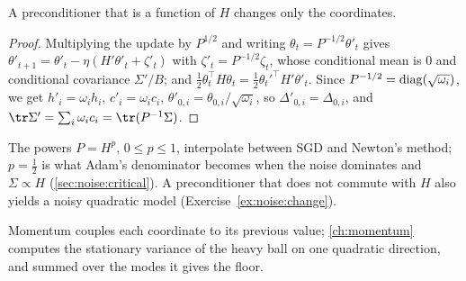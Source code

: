 \begin{refsection}
A preconditioner that is a function of $H$ changes only the coordinates.


\begin{proof}
Multiplying the update by $P^{1/2}$ and writing $\theta_t=P^{-1/2}\theta'_t$ gives $\theta'_{t+1}=\theta'_t-\eta(H'\theta'_t+\zeta'_t)$ with $\zeta'_t=P^{-1/2}\zeta_t$, whose conditional mean is $0$ and conditional covariance $\Sigma'/B$; and $\frac12\theta_t^\top H\theta_t=\frac12\theta_t'^\top H'\theta'_t$. Since $P^{-1/2}=\operatorname{diag}(\sqrt{\omega_i})$, we get $h'_i=\omega_ih_i$, $c'_i=\omega_ic_i$, $\theta'_{0,i}=\theta_{0,i}/\sqrt{\omega_i}$, so $\Delta'_{0,i}=\Delta_{0,i}$, and $\tr\Sigma'=\sum_i\omega_ic_i=\tr(P^{-1}\Sigma)$.
\end{proof}

The powers $P=H^p$, $0\le p\le1$, interpolate between SGD and Newton's method; $p=\frac12$ is what Adam's denominator becomes when the noise dominates and $\Sigma\propto H$ (\cref{sec:noise:critical}). A preconditioner that does not commute with $H$ also yields a noisy quadratic model (Exercise~\ref{ex:noise:change}).

Momentum couples each coordinate to its previous value; \cref{ch:momentum} computes the stationary variance of the heavy ball on one quadratic direction, and summed over the modes it gives the floor.


\end{refsection}
